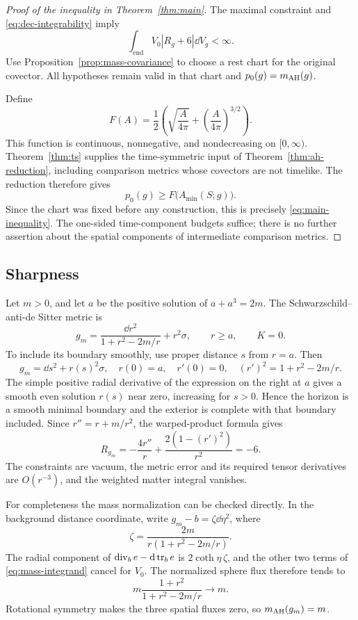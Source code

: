 \begin{proof}[Proof of the inequality in Theorem~\ref{thm:main}]
The maximal constraint and \eqref{eq:dec-integrability} imply
\[
 \int_{\mathrm{end}} V_0|R_g+6|\dd V_g<\infty.
\]
Use Proposition~\ref{prop:mass-covariance} to choose a rest chart
for the original covector. All hypotheses remain valid in that
chart and $p_0(g)=m_{\mathrm{AH}}(g)$.

Define
\[
 F(A)=\frac12\left(\sqrt{\frac A{4\pi}}
                       +\left(\frac A{4\pi}\right)^{3/2}\right).
\]
This function is continuous, nonnegative, and nondecreasing on
$[0,\infty)$. Theorem~\ref{thm:ts} supplies the time-symmetric input
of Theorem~\ref{thm:ah-reduction}, including comparison metrics whose
covectors are not timelike. The reduction therefore gives
\[
 p_0(g)\ge F\bigl(A_{\min}(S;g)\bigr).
\]
Since the chart was fixed before any construction, this is precisely
\eqref{eq:main-inequality}. The one-sided time-component budgets
suffice; there is no further assertion about the spatial components
of intermediate comparison metrics.
\end{proof}

\subsection{Sharpness}

Let $m>0$, and let $a$ be the positive solution of
$a+a^3=2m$. The Schwarzschild--anti-de Sitter metric is
\begin{equation}\label{eq:sads-metric}
 g_m=\frac{\dd r^2}{1+r^2-2m/r}+r^2\sigma,
 \qquad r\ge a,\qquad K=0.
\end{equation}
To include its boundary smoothly, use proper distance $s$ from
$r=a$. Then
\[
 g_m=\dd s^2+r(s)^2\sigma,
 \quad r(0)=a,\quad r'(0)=0,
 \quad (r')^2=1+r^2-2m/r.
\]
The simple positive radial derivative of the expression on the
right at $a$ gives a smooth even solution $r(s)$ near zero, increasing
for $s>0$. Hence the horizon is a smooth minimal boundary and the
exterior is complete with that boundary included. Since
$r''=r+m/r^2$, the warped-product formula gives
\[
 R_{g_m}=-\frac{4r''}{r}
             +\frac{2(1-(r')^2)}{r^2}=-6.
\]
The constraints are vacuum, the metric error and its required tensor
derivatives are $O(r^{-3})$, and the weighted matter integral vanishes.

For completeness the mass normalization can be checked directly.
In the background distance coordinate, write
$g_m-b=\zeta\dd\eta^2$, where
\[
 \zeta=\frac{2m}{r(1+r^2-2m/r)}.
\]
The radial component of $\operatorname{div}_b e-\mathop{}\!\mathrm d\operatorname{tr}_be$ is
$2\coth\eta\,\zeta$, and the other two terms of
\eqref{eq:mass-integrand} cancel for $V_0$.
The normalized sphere flux therefore tends to
\[
 m\frac{1+r^2}{1+r^2-2m/r}\longrightarrow m.
\]
Rotational symmetry makes the three spatial fluxes zero, so
$m_{\mathrm{AH}}(g_m)=m$.

